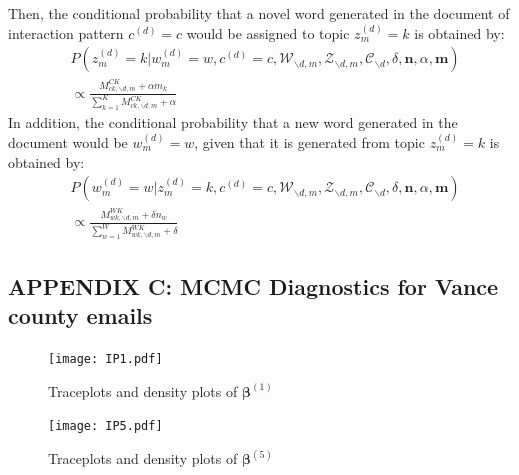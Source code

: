 \documentclass[a4paper]{article}
\begin{document}
Then, the conditional probability that a novel word generated in the document of interaction pattern $c^{(d)}=c$  would be assigned to topic $z_m^{(d)}=k$ is obtained by:
 \begin{equation}
 \begin{aligned}
 &P(z^{(d)}_m=k|w^{(d)}_m=w, c^{(d)}=c, \mathcal{W}_{\backslash d, m}, \mathcal{Z}_{\backslash d,m}, \mathcal{C}_{\backslash d}, \delta, \boldsymbol{n}, \alpha, \boldsymbol{m}) \\& \propto
 \frac{M^{CK}_{ck, \backslash d, m}+\alpha m_k}{\sum_{k=1}^KM^{CK}_{ck, \backslash d, m}+\alpha}
 \end{aligned}
 \end{equation}
In addition, the conditional probability that a new word generated in the document would be $w_m^{(d)}=w$, given that it is generated from topic $z_m^{(d)}=k$ is obtained by:
\begin{equation}
\begin{aligned}
& P(w^{(d)}_m=w|z^{(d)}_m=k, c^{(d)}=c, \mathcal{W}_{\backslash d, m}, \mathcal{Z}_{\backslash d,m}, \mathcal{C}_{\backslash d}, \delta, \boldsymbol{n}, \alpha, \boldsymbol{m}) \\& \propto 
\frac{M_{wk, \backslash d, m}^{WK}+\delta n_w}{\sum_{w=1}^WM_{wk, \backslash d, m}^{WK}+\delta}
\end{aligned} 
 \end{equation}
 \subsection*{APPENDIX C: MCMC Diagnostics for Vance county emails}
 \begin{figure}[ht]
 	\centering
 	\texttt{[image: IP1.pdf]} 
 		\caption{Traceplots and density plots of $\boldsymbol{\beta}^{(1)}$}
 	\label{fig:IP1}
 	 \end{figure}
 	  \begin{figure}[ht]
 	  	\centering
 	 	\texttt{[image: IP5.pdf]} 
 		 		 		\label{fig:IP5}
 			\caption{Traceplots and density plots of $\boldsymbol{\beta}^{(5)}$}
 	 \end{figure}


\end{document}
